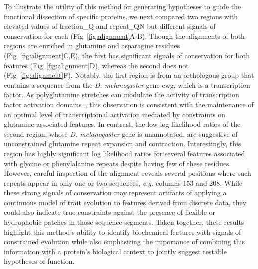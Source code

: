 To illustrate the utility of this method for generating hypotheses to guide the functional dissection of specific proteins, we next compared two regions with elevated values of fraction\_Q and repeat\_QN but different signals of conservation for each (Fig~\ref{fig:alignment}A-B). Though the alignments of both regions are enriched in glutamine and asparagine residues (Fig~\ref{fig:alignment}C,E), the first has significant signals of conservation for both features (Fig~\ref{fig:alignment}D), whereas the second does not (Fig~\ref{fig:alignment}F). Notably, the first region is from an orthologous group that contains a sequence from the \textit{D. melanogaster} gene {ewg}, which is a transcription factor. As polyglutamine stretches can modulate the activity of transcription factor activation domains~\cite{Mitchell1989, Gerber1994}, this observation is consistent with the maintenance of an optimal level of transcriptional activation mediated by constraints on glutamine-associated features. In contrast, the low log likelihood ratios of the second region, whose \textit{D. melanogaster} gene is unannotated, are suggestive of unconstrained glutamine repeat expansion and contraction. Interestingly, this region has highly significant log likelihood ratios for several features associated with glycine or phenylalanine repeats despite having few of these residues. However, careful inspection of the alignment reveals several positions where such repeats appear in only one or two sequences, \textit{e.g.} columns 153 and 208. While these strong signals of conservation may represent artifacts of applying a continuous model of trait evolution to features derived from discrete data, they could also indicate true constraints against the presence of flexible or hydrophobic patches in those sequence segments. Taken together, these results highlight this method's ability to identify biochemical features with signals of constrained evolution while also emphasizing the importance of combining this information with a protein's biological context to jointly suggest testable hypotheses of function.


